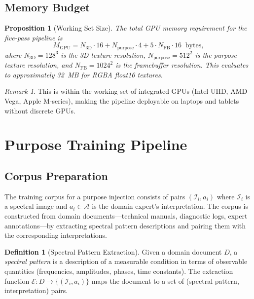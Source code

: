 \documentclass[11pt,twocolumn,a4paper]{article}
\newtheorem{proposition}[theorem]{Proposition}
\theoremstyle{definition}
\newtheorem{definition}[theorem]{Definition}
\theoremstyle{remark}
\newtheorem{remark}[theorem]{Remark}
\begin{document}
\subsection{Memory Budget}

\begin{proposition}[Working Set Size]\label{prop:memory}
The total GPU memory requirement for the five-pass pipeline is
\begin{equation}\label{eq:memory}
    M_{\mathrm{GPU}} = N_{\mathrm{3D}} \cdot 16 + N_{\mathrm{purpose}} \cdot 4 + 5 \cdot N_{\mathrm{FB}} \cdot 16 \;\;\text{bytes},
\end{equation}
where $N_{\mathrm{3D}} = 128^3$ is the 3D texture resolution, $N_{\mathrm{purpose}} = 512^2$ is the purpose texture resolution, and $N_{\mathrm{FB}} = 1024^2$ is the framebuffer resolution.  This evaluates to approximately 32~MB for RGBA float16 textures.
\end{proposition}

\begin{remark}
This is within the working set of integrated GPUs (Intel UHD, AMD Vega, Apple M-series), making the pipeline deployable on laptops and tablets without discrete GPUs.
\end{remark}


\section{Purpose Training Pipeline}\label{sec:training-pipeline}

\subsection{Corpus Preparation}

The training corpus for a purpose injection consists of pairs $(\mathcal{I}_i, a_i)$ where $\mathcal{I}_i$ is a spectral image and $a_i \in \mathcal{A}$ is the domain expert's interpretation.  The corpus is constructed from domain documents---technical manuals, diagnostic logs, expert annotations---by extracting spectral pattern descriptions and pairing them with the corresponding interpretations.

\begin{definition}[Spectral Pattern Extraction]\label{def:pattern-extraction}
Given a domain document $D$, a \emph{spectral pattern} is a description of a measurable condition in terms of observable quantities (frequencies, amplitudes, phases, time constants).  The extraction function $\mathcal{E} : D \to \{(\mathcal{I}_i, a_i)\}$ maps the document to a set of (spectral pattern, interpretation) pairs.
\end{definition}
\end{document}

